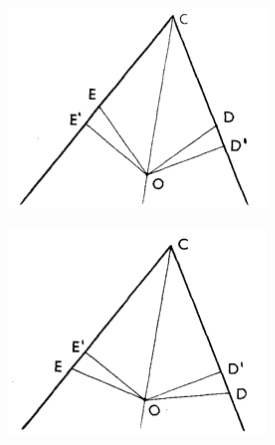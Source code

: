 \documentclass[14pt]{extarticle}
\begin{document}
\linespread{0.9}
\titleformat{\paragraph}{\centering}{}{0em}{}
\setlength{\columnsep}{20pt}
\twocolumn

\begin{figure}[h]
    \begin{subfigure}[h]{0.8\linewidth}
        \includegraphics[width=\textwidth]{1.1}
        \caption{}
    \end{subfigure}
    \begin{subfigure}[h]{0.8\linewidth}
        \includegraphics[width=\textwidth]{1.2}
        \caption{}
    \end{subfigure}
        \caption{}
\end{figure}
\end{document}
